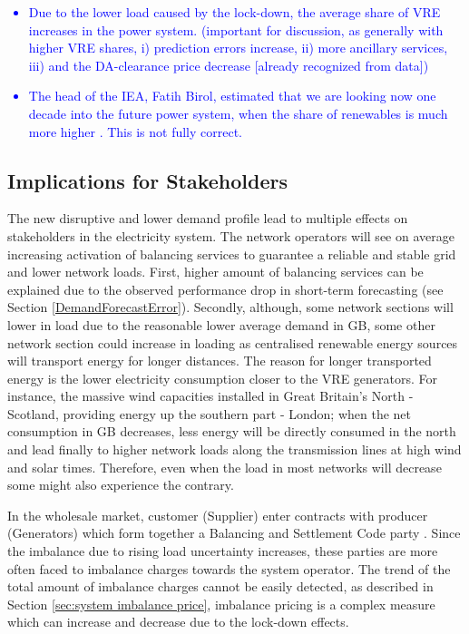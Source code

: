 \documentclass[energies,article,submit,moreauthors,pdftex]{Definitions/mdpi}
\begin{document}
\textcolor{blue}{
\begin{itemize}
    \item Due to the lower load caused by the lock-down, the average share of VRE increases in the power system. (important for discussion, as generally with higher VRE shares, i) prediction errors increase, ii) more ancillary services, iii) and the DA-clearance price decrease [already recognized from data])
\end{itemize}
}

\textcolor{blue}{
\begin{itemize}
    \item The head of the IEA, Fatih Birol, estimated that we are looking now one decade into the future power system, when the share of renewables is much more higher \cite{IgorTodorovic2020Birol:Balance}. This is not fully correct.
\end{itemize}
}

\subsection{Implications for Stakeholders}

The new disruptive and lower demand profile lead to multiple effects on stakeholders in the electricity system. The network operators will see on average increasing activation of balancing services to guarantee a reliable and stable grid and lower network loads. First, higher amount of balancing services can be explained due to the observed performance drop in short-term forecasting (see Section \ref{DemandForecastError}). Secondly, although, some network sections will lower in load due to the reasonable lower average demand in GB, some other network section could increase in loading as centralised renewable energy sources will transport energy for longer distances. The reason for longer transported energy is the lower electricity consumption closer to the VRE generators. For instance, the massive wind capacities installed in Great Britain's North - Scotland, providing energy up the southern part - London; when the net consumption in GB decreases, less energy will be directly consumed in the north and lead finally to higher network loads along the transmission lines at high wind and solar times. Therefore, even when the load in most networks will decrease some might also experience the contrary.

In the wholesale market, customer (Supplier) enter contracts with producer (Generators) which form together a Balancing and Settlement Code party \cite{ELEXON2019GuidanceBritain}. Since the imbalance due to rising load uncertainty increases, these parties are more often faced to imbalance charges towards the system operator. The trend of the total amount of imbalance charges cannot be easily detected, as described in Section \ref{sec:system imbalance price}, imbalance pricing is a complex measure which can increase and decrease due to the lock-down effects. 
\end{document}
